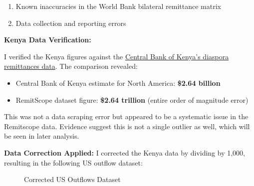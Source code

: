 \documentclass[
  11pt,
]{article}
\providecommand{\tightlist}{%
  \setlength{\itemsep}{0pt}\setlength{\parskip}{0pt}}\usepackage{longtable,booktabs,array}
\begin{document}
\begin{enumerate}
\def\labelenumi{\arabic{enumi}.}
\tightlist
\item
  Known inaccuracies in the World Bank bilateral remittance matrix
\item
  Data collection and reporting errors
\end{enumerate}

\textbf{Kenya Data Verification:}

I verified the Kenya figures against the
\href{https://www.centralbank.go.ke/diaspora-remittances/}{Central Bank
of Kenya's diaspora remittances data}. The comparison revealed:

\begin{itemize}
\tightlist
\item
  Central Bank of Kenya estimate for North America: \textbf{\$2.64
  billion}
\item
  RemitScope dataset figure: \textbf{\$2.64 trillion} (entire order of
  magnitude error)
\end{itemize}

This was not a data scraping error but appeared to be a systematic issue
in the Remitscope data. Evidence suggest this is not a single outlier as
well, which will be seen in later analysis.

\textbf{Data Correction Applied:} I corrected the Kenya data by dividing
by 1,000, resulting in the following US outflow dataset:

\begin{figure}[H]


\caption{\label{fig-us-outflows-corrected}Corrected US Outflows Dataset}

\end{figure}%
\end{document}
